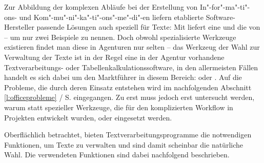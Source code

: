 Zur Abbildung der komplexen Abläufe bei der Erstellung von In"-for"-ma"-ti"-ons- und Kom"-mu"-ni"-ka"-ti"-ons"-me"-di"-en liefern etablierte Software-Hersteller passende Lösungen auch speziell für Texte: Mit  liefert  eine  \cite{adobeincopy} und  die  von   \cite{woodwing} -- um nur zwei Beispiele zu nennen. Doch obwohl spezialisierte Werkzeuge existieren findet man diese in Agenturen nur selten -- das Werkzeug der Wahl zur Verwaltung der Texte ist in der Regel eine in der Agentur vorhandene Textverarbeitungs- oder Tabellenkalkulationssoftware, in den allermeisten Fällen handelt es sich dabei um den Marktführer in diesem Bereich:   oder . Auf die Probleme, die durch deren Einsatz entstehen wird im nachfolgenden Abschnitt \ref{l:officeprobleme} / S.\pageref{l:officeprobleme} eingegangen. Zu erst muss jedoch erst untersucht werden, warum statt spezieller Werkzeuge, die für den komplizierten Workflow in Projekten entwickelt wurden,  oder  eingesetzt werden.

\bigskip

Oberflächlich betrachtet, bieten Textverarbeitungsprogramme die notwendigen Funktionen, um Texte zu verwalten und sind damit scheinbar die natürliche Wahl. Die verwendeten Funktionen sind dabei nachfolgend beschrieben.

